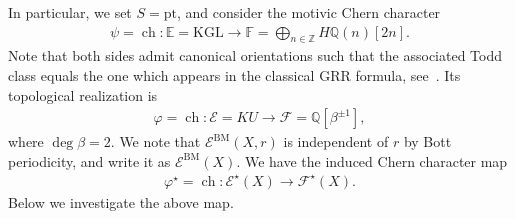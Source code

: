 \documentclass [11pt,oneside,a4paper,mathscr]{amsart}
\theoremstyle{definition}
\newcommand{\ch}{\operatorname{ch}}
\begin{document}
In particular, we set $S=\mathrm{pt}$, and consider the motivic Chern character
\begin{align*}
    \psi=\ch \colon \mathbb{E}=\mathrm{KGL} \to \mathbb{F}=\bigoplus_{n\in \mathbb{Z}}H\mathbb{Q}(n)[2n].
\end{align*}
Note that both sides admit canonical orientations such that the 
associated Todd class equals the one which appears in the classical 
GRR formula, see~\cite[2.5.3.3]{Deg1}. 
Its topological realization is 
\begin{align*}
   \varphi= \ch \colon \mathcal{E}=KU \to \mathcal{F}=\mathbb{Q}[\beta^{\pm 1}],
\end{align*}
where $\deg \beta=2$. We note that 
$\mathcal{E}^{\mathrm{BM}}(X, r)$ is independent of $r$ by Bott periodicity, 
and write it as $\mathcal{E}^{\mathrm{BM}}(X)$. 
We have the induced Chern character map 
\begin{align}\label{ch:Dsg}
    \varphi^{\star}=\ch \colon \mathcal{E}^{\star}(X) \to \mathcal{F}^{\star}(X).
\end{align}
Below we investigate the above map. 
\end{document}
